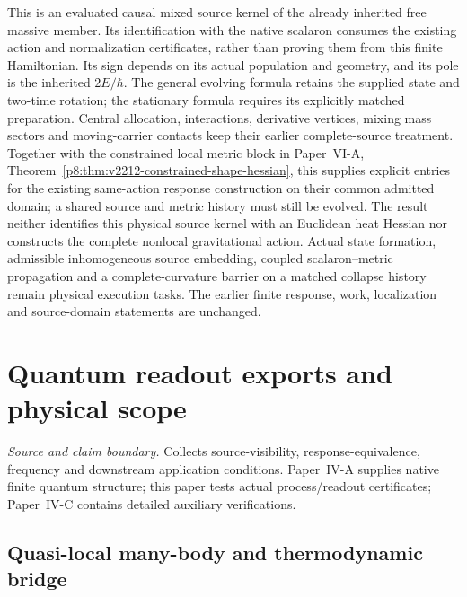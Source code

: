 \documentclass[12pt,a4paper]{article}
\begin{document}
\begin{remark}
\label{p4:rem:v2212-conformal-shape-scope}
This is an evaluated causal mixed source kernel of the already inherited
free massive member. Its identification with the native scalaron consumes
the existing action and normalization certificates, rather than proving
them from this finite Hamiltonian. Its sign depends on its actual population and
geometry, and its pole is the inherited $2E/\hbar$. The general evolving
formula retains the supplied state and two-time rotation; the stationary
formula requires its explicitly matched preparation. Central allocation,
interactions, derivative vertices, mixing mass sectors and moving-carrier
contacts keep their earlier complete-source treatment.
Together with the constrained local metric block in Paper~VI-A,
Theorem~\ref{p8:thm:v2212-constrained-shape-hessian}, this supplies
explicit entries for the existing same-action response construction on
their common admitted domain; a shared source and metric history must
still be evolved. The result neither identifies this physical source kernel with an
Euclidean heat Hessian nor constructs the complete nonlocal gravitational
action. Actual state formation, admissible inhomogeneous source embedding,
coupled scalaron--metric propagation and a complete-curvature barrier on
a matched collapse history remain physical execution tasks. The earlier
finite response, work, localization and source-domain statements are
unchanged.
\end{remark}



\section{Quantum readout exports and physical scope}
\label{p4b:sec:v238-b8}
\noindent\textit{Source and claim boundary.} Collects source-visibility, response-equivalence, frequency and downstream application conditions. Paper~IV-A supplies native finite quantum structure; this paper tests actual process/readout certificates; Paper~IV-C contains detailed auxiliary verifications.

\subsection{Quasi-local many-body and thermodynamic bridge}
\label{p4:sec:part2-thermodynamic-bridge}
\end{document}
